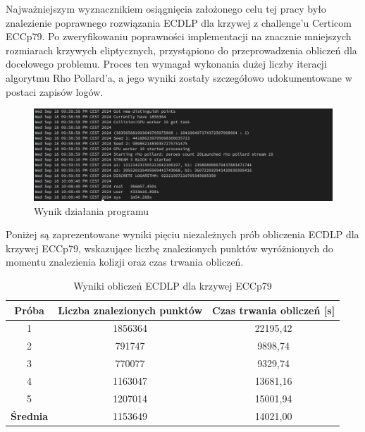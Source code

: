 Najważniejszym wyznacznikiem osiągnięcia założonego celu tej pracy było
znalezienie poprawnego rozwiązania ECDLP dla krzywej z challenge'u Certicom ECCp79.
Po zweryfikowaniu poprawności implementacji na znacznie mniejszych rozmiarach
krzywych eliptycznych, przystąpiono do przeprowadzenia obliczeń dla docelowego
problemu. Proces ten wymagał wykonania dużej liczby iteracji algorytmu Rho Pollard'a,
a jego wyniki zostały szczegółowo udokumentowane w postaci zapisów logów.
\begin{figure}[H]
    \centering
    \includegraphics[width=1\textwidth]{img/first_attempt.png}
    \caption{Wynik działania programu}
    \label{fig:first_attempt}
\end{figure}

Poniżej są zaprezentowane wyniki pięciu niezależnych prób obliczenia ECDLP dla
krzywej ECCp79, wskazujące liczbę znalezionych punktów wyróżnionych do momentu
znalezienia kolizji oraz czas trwania obliczeń.
\begin{table}[H]
    \centering
    \caption{Wyniki obliczeń ECDLP dla krzywej ECCp79}
    \label{tab:eccp79_results}
    \begin{tabular}{|c|c|c|}
        \hline
        \textbf{Próba}   & \textbf{Liczba znalezionych punktów} &
        \textbf{Czas trwania obliczeń [s]}                                 \\ \hline
        1                & 1856364                              & 22195,42 \\ \hline
        2                & 791747                               & 9898,74  \\ \hline
        3                & 770077                               & 9329,74  \\ \hline
        4                & 1163047                              & 13681,16 \\ \hline
        5                & 1207014                              & 15001,94 \\ \hline
        \textbf{Średnia} & 1153649                              & 14021,00 \\ \hline
    \end{tabular}
\end{table}



